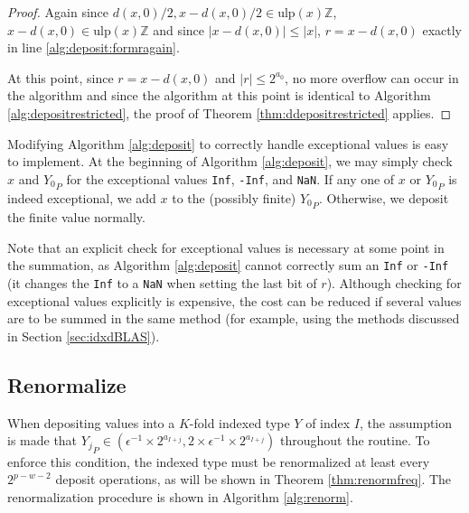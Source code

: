 \documentclass[12pt]{article}
\providecommand{\Z}{\ensuremath{\mathbb{Z}}}
\providecommand{\ulp}{\ensuremath{\text{ulp}}}
\theoremstyle{definition}
\numberwithin{equation}{section}
\numberwithin{figure}{section}
\begin{document}
\begin{proof}
        Again since $d(x, 0)/2, x - d(x, 0)/2 \in \ulp(x)\Z$, $x - d(x, 0) \in \ulp(x)\Z$ and since $|x - d(x, 0)| \leq |x|$, $r = x - d(x, 0)$ exactly in line \ref{alg:deposit:formragain}.

        At this point, since $r = x - d(x, 0)$ and $|r| \leq 2^{a_0}$, no more overflow can occur in the algorithm and since the algorithm at this point is identical to Algorithm \ref{alg:depositrestricted}, the proof of Theorem \ref{thm:ddepositrestricted} applies.
      \end{proof}

      Modifying Algorithm \ref{alg:deposit} to correctly handle exceptional values is easy to implement. At the beginning of Algorithm \ref{alg:deposit}, we may simply check $x$ and ${Y_0}_P$ for the exceptional values \texttt{Inf}, \texttt{-Inf}, and \texttt{NaN}. If any one of $x$ or ${Y_0}_P$ is indeed exceptional, we add $x$ to the (possibly finite) ${Y_0}_P$. Otherwise, we deposit the finite value normally.

      Note that an explicit check for exceptional values is necessary at some point in the summation, as Algorithm \ref{alg:deposit} cannot correctly sum an \texttt{Inf} or \texttt{-Inf} (it changes the \texttt{Inf} to a \texttt{NaN} when setting the last bit of $r$). Although checking for exceptional values explicitly is expensive, the cost can be reduced if several values are to be summed in the same method (for example, using the methods discussed in Section \ref{sec:idxdBLAS}).



  \subsection{Renormalize}
    \label{sec:primitiveops_renormalize}
    When depositing values into a $K$-fold indexed type $Y$ of index $I$, the assumption is made that ${Y_j}_P \in (\epsilon^{-1}\times 2^{a_{I + j}}, 2 \times \epsilon^{-1}\times 2^{a_{I + j}})$ throughout the routine. To enforce this condition, the indexed type must be renormalized at least every $2^{p - w - 2}$ deposit operations, as will be shown in Theorem \ref{thm:renormfreq}. The renormalization procedure is shown in Algorithm \ref{alg:renorm}.
\end{document}
